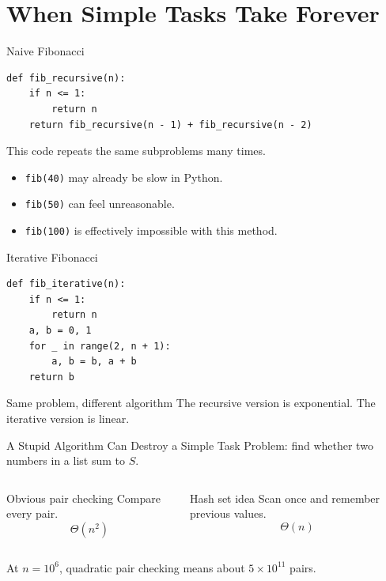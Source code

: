 \documentclass[aspectratio=169,xcolor=dvipsnames]{beamer}
\begin{document}
\section{When Simple Tasks Take Forever}

\begin{frame}[fragile]{Naive Fibonacci}
  \begin{lstlisting}
def fib_recursive(n):
    if n <= 1:
        return n
    return fib_recursive(n - 1) + fib_recursive(n - 2)
  \end{lstlisting}
  \vspace{0.5em}
  This code repeats the same subproblems many times.
  \begin{itemize}
    \item \texttt{fib(40)} may already be slow in Python.
    \item \texttt{fib(50)} can feel unreasonable.
    \item \texttt{fib(100)} is effectively impossible with this method.
  \end{itemize}
\end{frame}

\begin{frame}[fragile]{Iterative Fibonacci}
  \begin{lstlisting}
def fib_iterative(n):
    if n <= 1:
        return n
    a, b = 0, 1
    for _ in range(2, n + 1):
        a, b = b, a + b
    return b
  \end{lstlisting}
  \vspace{0.5em}
  \begin{exampleblock}{Same problem, different algorithm}
    The recursive version is exponential. The iterative version is linear.
  \end{exampleblock}
\end{frame}

\begin{frame}{A Stupid Algorithm Can Destroy a Simple Task}
  Problem: find whether two numbers in a list sum to $S$.
  \begin{columns}
    \begin{block}{Obvious pair checking}
      Compare every pair.
      \[
        \Theta(n^2)
      \]
    \end{block}
    \begin{exampleblock}{Hash set idea}
      Scan once and remember previous values.
      \[
        \Theta(n)
      \]
    \end{exampleblock}
  \end{columns}
  \vspace{0.7em}
  At $n=10^6$, quadratic pair checking means about $5\times 10^{11}$ pairs.
\end{frame}
\end{document}
